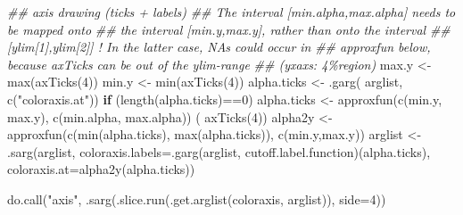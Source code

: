 \documentclass[
  letterpaper,
  DIV=11,
  numbers=noendperiod]{scrartcl}
\newenvironment{Shaded}{\begin{snugshade}}{\end{snugshade}}
\newcommand{\AttributeTok}[1]{\textcolor[rgb]{0.40,0.45,0.13}{#1}}
\newcommand{\ControlFlowTok}[1]{\textcolor[rgb]{0.00,0.23,0.31}{\textbf{#1}}}
\newcommand{\DecValTok}[1]{\textcolor[rgb]{0.68,0.00,0.00}{#1}}
\newcommand{\DocumentationTok}[1]{\textcolor[rgb]{0.37,0.37,0.37}{\textit{#1}}}
\newcommand{\FunctionTok}[1]{\textcolor[rgb]{0.28,0.35,0.67}{#1}}
\newcommand{\NormalTok}[1]{\textcolor[rgb]{0.00,0.23,0.31}{#1}}
\newcommand{\OtherTok}[1]{\textcolor[rgb]{0.00,0.23,0.31}{#1}}
\newcommand{\SpecialCharTok}[1]{\textcolor[rgb]{0.37,0.37,0.37}{#1}}
\newcommand{\StringTok}[1]{\textcolor[rgb]{0.13,0.47,0.30}{#1}}
\begin{document}
\begin{Shaded}
\begin{Highlighting}[]
            \DocumentationTok{\#\# axis drawing (ticks + labels)}
            \DocumentationTok{\#\# The interval [min.alpha,max.alpha] needs to be mapped onto}
            \DocumentationTok{\#\# the interval [min.y,max.y], rather than onto the interval}
            \DocumentationTok{\#\# [ylim[1],ylim[2]] ! In the latter case, NAs could occur in}
            \DocumentationTok{\#\# approxfun below, because axTicks can be out of the ylim{-}range}
            \DocumentationTok{\#\# (\textquotesingle{}yxaxs\textquotesingle{}: 4\%region)}
\NormalTok{            max.y }\OtherTok{\textless{}{-}} \FunctionTok{max}\NormalTok{(}\FunctionTok{axTicks}\NormalTok{(}\DecValTok{4}\NormalTok{))}
\NormalTok{            min.y }\OtherTok{\textless{}{-}} \FunctionTok{min}\NormalTok{(}\FunctionTok{axTicks}\NormalTok{(}\DecValTok{4}\NormalTok{))}
\NormalTok{            alpha.ticks }\OtherTok{\textless{}{-}} \FunctionTok{.garg}\NormalTok{( arglist, }\FunctionTok{c}\NormalTok{(}\StringTok{"coloraxis.at"}\NormalTok{))}
            \ControlFlowTok{if}\NormalTok{ (}\FunctionTok{length}\NormalTok{(alpha.ticks)}\SpecialCharTok{==}\DecValTok{0}\NormalTok{)}
\NormalTok{              alpha.ticks }\OtherTok{\textless{}{-}} \FunctionTok{approxfun}\NormalTok{(}\FunctionTok{c}\NormalTok{(min.y, max.y),}
                                       \FunctionTok{c}\NormalTok{(min.alpha, max.alpha)) ( }\FunctionTok{axTicks}\NormalTok{(}\DecValTok{4}\NormalTok{))}
\NormalTok{            alpha2y }\OtherTok{\textless{}{-}} \FunctionTok{approxfun}\NormalTok{(}\FunctionTok{c}\NormalTok{(}\FunctionTok{min}\NormalTok{(alpha.ticks), }\FunctionTok{max}\NormalTok{(alpha.ticks)),}
                                 \FunctionTok{c}\NormalTok{(min.y,max.y))}
\NormalTok{            arglist }\OtherTok{\textless{}{-}}
              \FunctionTok{.sarg}\NormalTok{(arglist,}
                    \AttributeTok{coloraxis.labels=}\FunctionTok{.garg}\NormalTok{(arglist,}
                      \StringTok{\textquotesingle{}cutoff.label.function\textquotesingle{}}\NormalTok{)(alpha.ticks),}
                    \AttributeTok{coloraxis.at=}\FunctionTok{alpha2y}\NormalTok{(alpha.ticks))}
            
            \FunctionTok{do.call}\NormalTok{(}\StringTok{"axis"}\NormalTok{,}
                    \FunctionTok{.sarg}\NormalTok{(}\FunctionTok{.slice.run}\NormalTok{(}\FunctionTok{.get.arglist}\NormalTok{(}\StringTok{\textquotesingle{}coloraxis\textquotesingle{}}\NormalTok{, arglist)),}
                          \AttributeTok{side=}\DecValTok{4}\NormalTok{))}


\end{Highlighting}
\end{Shaded}
\end{document}
